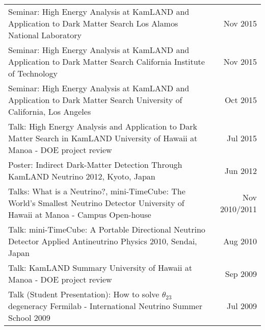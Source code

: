 \documentclass[11pt]{article} %
\begin{document}
\begin{tabularx}{\linewidth}{@{{}\textbullet\enskip}X@{\quad}r@{}}
\addlinespace[5pt]
Seminar: High Energy Analysis at KamLAND and Application to Dark Matter Search \newline Los Alamos National Laboratory & Nov 2015 \\

\addlinespace[5pt]
Seminar: High Energy Analysis at KamLAND and Application to Dark Matter Search \newline California Institute of Technology & Nov 2015 \\

\addlinespace[5pt]
Seminar: High Energy Analysis at KamLAND and Application to Dark Matter Search \newline University of California, Los Angeles & Oct 2015 \\

\addlinespace[5pt]
Talk: High Energy Analysis and Application to Dark Matter Search in KamLAND \newline University of Hawaii at Manoa - DOE project review & Jul 2015 \\

\addlinespace[5pt]
Poster: Indirect Dark-Matter Detection Through KamLAND \newline Neutrino 2012, Kyoto, Japan & Jun 2012 \\

\addlinespace[5pt]
Talks: What is a Neutrino?, mini-TimeCube: The World's Smallest Neutrino Detector \newline University of Hawaii at Manoa - Campus Open-house & Nov 2010/2011 \\

\addlinespace[5pt]
Talk: mini-TimeCube: A Portable Directional Neutrino Detector \newline Applied Antineutrino Physics 2010, Sendai, Japan & Aug 2010 \\

\addlinespace[5pt]
Talk: KamLAND Summary \newline University of Hawaii at Manoa - DOE project review & Sep 2009 \\

\addlinespace[5pt]
Talk (Student Presentation): How to solve $\theta_{23}$ degeneracy \newline Fermilab - International Neutrino Summer School 2009 & Jul 2009 \\

\end{tabularx}

\end{document}
